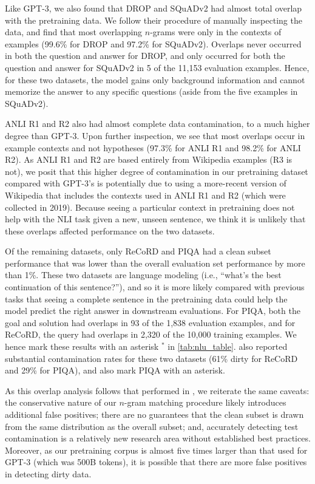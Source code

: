 Like GPT-3, we also found that DROP and SQuADv2 had almost total overlap with the pretraining data.
We follow their procedure of manually inspecting the data, and find that most overlapping $n$-grams were only in the contexts of examples (99.6\% for DROP and 97.2\% for SQuADv2).
Overlaps never occurred in both the question and answer for DROP, and only occurred for both the question and answer for SQuADv2 in 5 of the 11,153 evaluation examples.
Hence, for these two datasets, the model gains only background information and cannot memorize the answer to any specific questions (aside from the five examples in SQuADv2).

ANLI R1 and R2 \citep{anli} also had almost complete data contamination, to a much higher degree than GPT-3. 
Upon further inspection, we see that most overlaps occur in example contexts and not hypotheses (97.3\% for ANLI R1 and 98.2\% for ANLI R2). 
As ANLI R1 and R2 are based entirely from Wikipedia examples (R3 is not), we posit that this higher degree of contamination in our pretraining dataset compared with GPT-3's is potentially due to using a more-recent version of Wikipedia that includes the contexts used in ANLI R1 and R2 (which were collected in 2019). 
Because seeing a particular context in pretraining does not help with the NLI task given a new, unseen sentence, we think it is unlikely that these overlaps affected performance on the two datasets.

Of the remaining datasets, only ReCoRD and PIQA had a clean subset performance that was lower than the overall evaluation set performance by more than 1\%. 
These two datasets are language modeling (i.e., ``what's the best continuation of this sentence?''), and so it is more likely compared with previous tasks that seeing a complete sentence in the pretraining data could help the model predict the right answer in downstream evaluations.
For PIQA, both the goal and solution had overlaps in 93 of the 1,838 evaluation examples, and for ReCoRD, the query had overlaps in 2,320 of the 10,000 training examples.
We hence mark these results with an asterisk $^*$ in \cref{tab:nlu_table}.
\citet{brown2020language} also reported substantial contamination rates for these two datasets (61\% dirty for ReCoRD and 29\% for PIQA), and also mark PIQA with an asterisk.

As this overlap analysis follows that performed in \citet{brown2020language}, we reiterate the same caveats: the conservative nature of our $n$-gram matching procedure likely introduces additional false positives; there are no guarantees that the clean subset is drawn from the same distribution as the overall subset; and, accurately detecting test contamination is a relatively new research area without established best practices.
Moreover, as our pretraining corpus is almost five times larger than that used for GPT-3 (which was 500B tokens), it is possible that there are more false positives in detecting dirty data.

